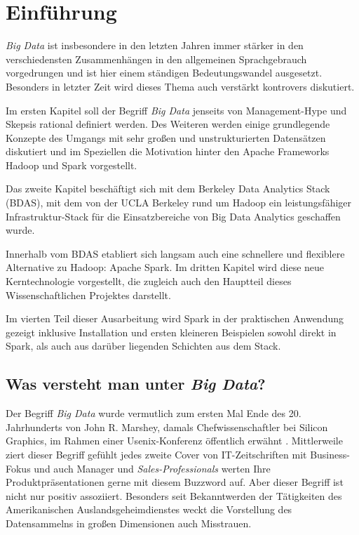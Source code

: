 \chapter{Einführung}
\label{chapter:einfuehrung}

\textit{Big Data} ist insbesondere in den letzten Jahren immer stärker in den verschiedensten Zusammenhängen in den allgemeinen Sprachgebrauch vorgedrungen und ist hier einem ständigen Bedeutungswandel ausgesetzt. Besonders in letzter Zeit wird dieses Thema auch verstärkt kontrovers diskutiert.  

Im ersten Kapitel soll der Begriff \textit{Big Data} jenseits von Management-Hype und Skepsis rational definiert werden. Des Weiteren werden einige grundlegende Konzepte des Umgangs mit sehr großen und unstrukturierten Datensätzen diskutiert und im Speziellen die Motivation hinter den Apache Frameworks Hadoop und Spark vorgestellt.  

Das zweite Kapitel beschäftigt sich mit dem Berkeley Data Analytics Stack (BDAS), mit dem von der UCLA Berkeley rund um Hadoop ein leistungsfähiger Infrastruktur-Stack für die Einsatzbereiche von Big Data Analytics geschaffen wurde. 

Innerhalb vom BDAS etabliert sich langsam auch eine schnellere und flexiblere Alternative zu Hadoop: Apache Spark. Im dritten Kapitel wird diese neue Kerntechnologie vorgestellt, die zugleich auch den Hauptteil dieses Wissenschaftlichen Projektes darstellt. 

Im vierten Teil dieser Ausarbeitung wird Spark in der praktischen Anwendung gezeigt inklusive Installation und ersten kleineren Beispielen sowohl direkt in Spark, als auch aus darüber liegenden Schichten aus dem Stack. 

\section{Was versteht man unter \textit{Big Data}?}
\label{section:was versteht man unter Big Data?}


Der Begriff \textit{Big Data} wurde vermutlich zum ersten Mal Ende des 20. Jahrhunderts von John R. Marshey, damals Chefwissenschaftler bei Silicon Graphics, im Rahmen einer Usenix-Konferenz öffentlich erwähnt . Mittlerweile ziert dieser Begriff gefühlt jedes zweite Cover von IT-Zeitschriften mit Business-Fokus und auch Manager und \textit{Sales-Professionals} werten Ihre Produktpräsentationen gerne mit diesem Buzzword auf.  Aber dieser Begriff ist nicht nur positiv assoziiert. Besonders seit Bekanntwerden der Tätigkeiten des Amerikanischen Auslandsgeheimdienstes weckt die Vorstellung des Datensammelns in großen Dimensionen auch Misstrauen. 

